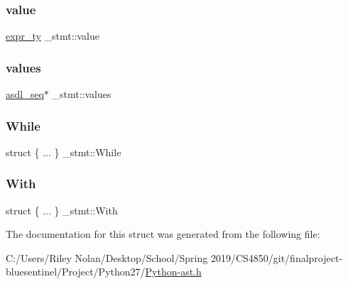 \mbox{\label{struct__stmt_af74f15a2e6d4ef9423f8f6595de0b802}} 
\subsubsection{\texorpdfstring{value}{value}}
{\footnotesize\ttfamily \mbox{\hyperlink{_python-ast_8h_a56d3705e020a071405094a220c4592bd}{expr\+\_\+ty}} \+\_\+stmt\+::value}

\mbox{\label{struct__stmt_aec371454808c8e926659676e3c454bcc}} 
\subsubsection{\texorpdfstring{values}{values}}
{\footnotesize\ttfamily \mbox{\hyperlink{structasdl__seq}{asdl\+\_\+seq}}$\ast$ \+\_\+stmt\+::values}

\mbox{\label{struct__stmt_a0e4b5ff38c91a9d639ad2e72b44a5b55}} 
\subsubsection{\texorpdfstring{While}{While}}
{\footnotesize\ttfamily struct \{ ... \}   \+\_\+stmt\+::\+While}

\mbox{\label{struct__stmt_aa5ad76e29931c06349137816f5ff304e}} 
\subsubsection{\texorpdfstring{With}{With}}
{\footnotesize\ttfamily struct \{ ... \}   \+\_\+stmt\+::\+With}



The documentation for this struct was generated from the following file\+:\begin{DoxyCompactItemize}
\item 
C\+:/\+Users/\+Riley Nolan/\+Desktop/\+School/\+Spring 2019/\+C\+S4850/git/finalproject-\/bluesentinel/\+Project/\+Python27/\mbox{\hyperlink{_python-ast_8h}{Python-\/ast.\+h}}\end{DoxyCompactItemize}

